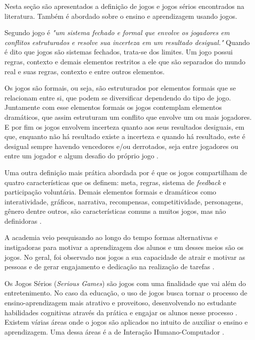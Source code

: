 Nesta seção são apresentados a definição de jogos e jogos sérios encontrados na literatura. Também é abordado sobre o ensino e aprendizagem usando jogos.

Segundo  jogo é \textit{"um sistema fechado e formal que envolve os jogadores em conflitos estruturados e resolve sua incerteza em um resultado desigual."} Quando é dito que jogos são sistemas fechados, trata-se dos limites. Um jogo possui regras, contexto e demais elementos restritos a ele que são separados do mundo real e suas regras, contexto e entre outros elementos. 

Os jogos são formais, ou seja, são estruturados por elementos formais que se relacionam entre si, que podem se diversificar dependendo do tipo de jogo. Juntamente com esse elementos formais os jogos contemplam elementos dramáticos, que assim estruturam um conflito que envolve um ou mais jogadores. E por fim os jogos envolvem incerteza quanto aos seus resultados desiguais, em que, enquanto não há resultado existe a incerteza e quando há resultado, este é desigual sempre havendo vencedores e/ou derrotados, seja entre jogadores ou entre um jogador e algum desafio do próprio jogo \cite{Fullerton_2008}.

Uma outra definição mais prática abordada por \cite{McGonigal_Rieche_2012} é que os jogos compartilham de quatro características que os definem: meta, regras, sistema de \textit{feedback} e participação voluntária. Demais elementos formais e dramáticos como interatividade, gráficos, narrativa, recompensas, competitividade, personagens, gênero dentre outros, são características comuns a muitos jogos, mas não definidoras \cite{Vianna_Vianna_Medina_Tanaka_Krug_2013}.

A academia veio pesquisando ao longo do tempo formas alternativas e instigadoras para motivar a aprendizagem dos alunos e um desses meios são os jogos. No geral, foi observado nos jogos a sua capacidade de atrair e motivar as pessoas e de gerar engajamento e dedicação na realização de tarefas \cite{Vianna_Vianna_Medina_Tanaka_Krug_2013}. 

Os Jogos Sérios (\textit{Serious Games}) são jogos com uma finalidade que vai além do entretenimento. No caso da educação, o uso de jogos busca tornar o processo de ensino-aprendizagem mais atrativo e proveitoso, desenvolvendo no estudante habilidades cognitivas através da prática e engajar os alunos nesse processo \cite{sommariva, queiroz, darin}. Existem várias áreas onde o jogos são aplicados no intuito de auxiliar o ensino e aprendizagem. Uma dessa áreas é a de Interação Humano-Computador \cite{Sales2020, Sales2020UsoTDS}.


